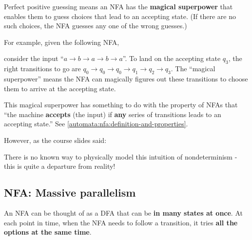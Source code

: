 \documentclass[12pt, letterpaper, oneside]{book}
\begin{document}
Perfect positive guessing means an NFA has the \textbf{magical superpower} that enables them to guess choices that lead
to an accepting state. (If there are no such choices, the NFA guesses any one of the wrong guesses.)

For example, given the following NFA,


consider the input ``$a \rightarrow b \rightarrow a \rightarrow b \rightarrow a$''. To land on the accepting state
$q_3$, the right transitions to go are $q_0 \rightarrow q_0 \rightarrow q_0 \rightarrow q_1 \rightarrow q_2 \rightarrow
  q_3$. The ``magical superpower'' means the NFA can magically figures out these transitions to choose them to arrive
at the accepting state.

This magical superpower has something to do with the property of NFAs that ``the machine \textbf{accepts} (the input)
if \textbf{any} series of transitions leads to an accepting state.'' See \ref{automata:nfa:definition-and-properties}.

However, as the course slides said:

\begin{displayquote}
  There is no known way to physically model this intuition of nondeterminism - this is quite a departure from reality!
\end{displayquote}

\subsection{NFA: Massive parallelism}

An NFA can be thought of as a DFA that can be \textbf{in many states at once}. At each point in time, when the NFA
needs to follow a transition, it tries \textbf{all the options at the same time}.
\end{document}
